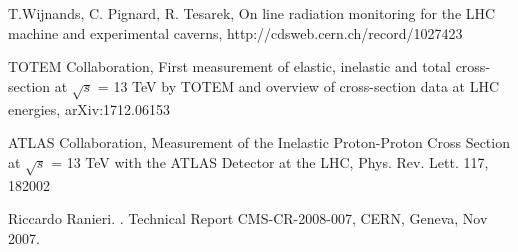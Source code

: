 \begin{thebibliography}{99}
 
 T.Wijnands, C. Pignard, R. Tesarek, On line radiation monitoring for the LHC machine and experimental caverns,
http://cdsweb.cern.ch/record/1027423

 TOTEM Collaboration, First measurement of elastic, inelastic and total cross-section at $\sqrt{s}$ = 13 TeV by TOTEM and overview of cross-section data at LHC energies,
arXiv:1712.06153
 
 ATLAS Collaboration, Measurement of the Inelastic Proton-Proton Cross Section at $\sqrt{s}$ = 13 TeV with the ATLAS Detector at the LHC,
Phys. Rev. Lett. 117, 182002


Riccardo Ranieri.
.
\newblock Technical Report CMS-CR-2008-007, CERN, Geneva, Nov 2007.


\end{thebibliography}
